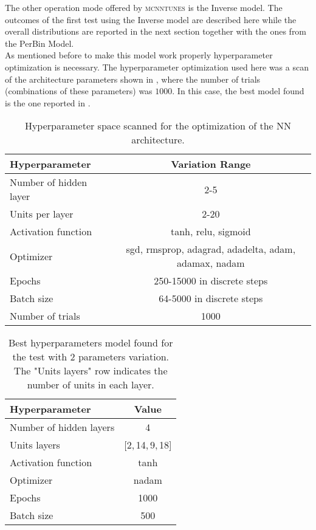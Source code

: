 The other operation mode offered by \textsc{mcnntunes} is the Inverse model. 
The outcomes of the first test using the Inverse model are described here while the overall distributions are reported in the next section together with the ones from the PerBin Model. 
\\
As mentioned before to make this model work properly hyperparameter optimization is necessary. The hyperparameter optimization used here was a scan of the architecture parameters shown in , where the number of trials (combinations of these parameters) was $1000$. In this case, the best model found is the one reported in .
\begin{table}[!htb]
	\centering
	\begin{tabular}{| l | c |}
	\hline
	Hyperparameter & Variation Range\\[2pt]\hline
	Number of hidden layer & 2-5 \\[2pt]
	Units per layer & 2-20 \\[2pt]
	Activation function & tanh, relu, sigmoid \\[2pt]
	Optimizer & {\small sgd, rmsprop, adagrad, adadelta, adam, adamax, nadam}\\[2pt]
	Epochs & 250-15000 in discrete steps\\[2pt]
	Batch size & 64-5000 in discrete steps\\[2pt] \hline
	Number of trials & 1000\\[2pt]\hline
	\end{tabular}
	\caption{Hyperparameter space scanned for the optimization of the NN architecture.}
	\label{table:hyperpar_MinBias_2par}
\end{table}


\begin{table}[!htb]
	\centering
	\begin{tabular}{ l | c }
	Hyperparameter & Value\\[2pt]\hline\hline
	Number of hidden layers & 4 \\[2pt]
	Units layers & [2,\,14,\,9,\,18] \\[2pt]
	Activation function & tanh \\[2pt]
	Optimizer & nadam\\[2pt]
	Epochs & 1000\\[2pt]
	Batch size & 500\\[2pt]
	\end{tabular}
	\caption{Best hyperparameters model found for the test with 2 parameters variation. The "Units layers" row indicates the number of units in each layer.}
	\label{table:hyperpar_2parTEST}
\end{table}

